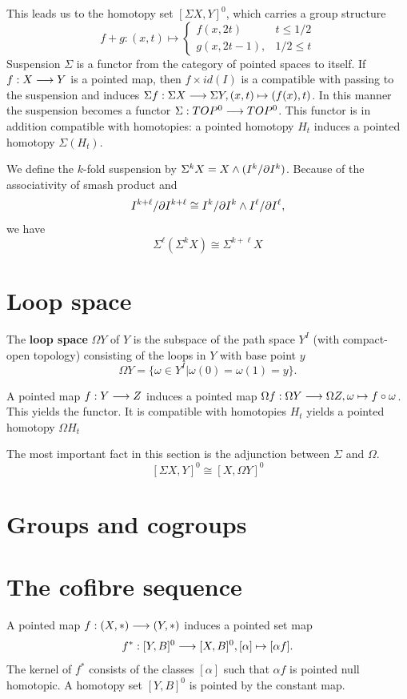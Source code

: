 \documentclass[11pt]{book} %
\begin{document}
This leads us to the homotopy set $[\Sigma X, Y]^0$, which carries a group structure
$$
f+g:(x,t)\mapsto\left\{\begin{aligned}
f(x,2t) & t\leq 1/2\\
g(x,2t-1), & 1/2\leq t
\end{aligned}\right.
$$
Suspension $\Sigma$ is a functor from the category of pointed spaces to itself. If $f: X\longrightarrow Y$ is a pointed map, then $f\times id(I)$ is a compatible with passing to the suspension and induces $\Sigma f: \Sigma X\longrightarrow \Sigma Y, (x,t)\mapsto (f(x),t)$. In this manner the suspension becomes a functor $\Sigma: TOP^0\longrightarrow TOP^0$. This functor is in addition compatible with homotopies: a pointed homotopy $H_t$ induces a pointed homotopy $\Sigma(H_t)$.

We define the $k$-fold suspension by $\Sigma^k X=X\wedge (I^k/{\partial} I^k)$. Because of the associativity of smash product and 
$$
I^{k+\ell}/{\partial} I^{k+\ell}\cong I^k/{\partial} I^k\wedge I^\ell/{\partial} I^\ell,
$$
 we have
 $$
\Sigma^\ell(\Sigma^k X)\cong\Sigma^{k+\ell}X
 $$

\section{Loop space}
\begin{definition}
The \textbf{loop space} $\Omega Y$ of $Y$ is the subspace of the path space $Y^I$ (with compact-open topology) consisting of the loops in $Y$ with base point $y$
$$
\Omega Y=\{\omega\in Y^I|\omega(0)=\omega(1)=y\}.
$$
\end{definition}

A pointed map $f: Y\longrightarrow Z$ induces a pointed map $\Omega f:\Omega Y\longrightarrow \Omega Z,\omega\mapsto f\circ \omega$. This yields the functor. It is compatible with homotopies $H_t$ yields a pointed homotopy $\Omega H_t$


The most important fact in this section is 
the adjunction between $\Sigma$ and $\Omega$.
$$
[\Sigma X, Y]^0\cong[X,\Omega Y]^0
$$
\section{Groups and cogroups}


\section{The cofibre sequence}

A pointed map $f: (X,*)\longrightarrow (Y,*)$ induces a pointed set map
$$
f^*:[Y,B]^0\longrightarrow [X, B]^0, [\alpha]\mapsto [\alpha f].
$$
The kernel of $f^*$ consists of the classes $[\alpha]$ such that $\alpha f$ is pointed null homotopic. A homotopy set $[Y,B]^0$ is pointed by the constant map.
\end{document}
